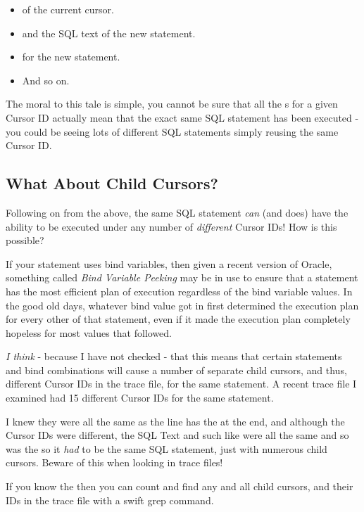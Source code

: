 \begin{itemize}
	\item {} of the current cursor.
	\item {} and the SQL text of the new statement.
	\item {} for the new statement.
	\item And so on.
\end{itemize}

The moral to this tale is simple, you cannot be sure that all the s for a given Cursor ID actually mean that the exact same SQL statement has been executed - you could be seeing lots of different SQL statements simply reusing the same Cursor ID.

\subsection{What About Child Cursors?}

Following on from the above, the same SQL statement \emph{can} (and does) have the ability to be executed under any number of \emph{different} Cursor IDs! How is this possible?

If your statement uses bind variables, then given a recent version of Oracle, something called \emph{Bind Variable Peeking} may be in use to ensure that a statement has the most efficient plan of execution regardless of the bind variable values. In the good old days, whatever bind value got in first determined the execution plan for every other  of that statement, even if it made the execution plan completely hopeless for most values that followed.

\emph{I think} - because I have not checked - that this means that certain statements and bind combinations will cause a number of separate child cursors, and thus, different Cursor IDs in the trace file, for the same statement. A recent trace file I examined had 15 different Cursor IDs for the same statement. 

I knew they were all the same as the  line has the  at the end, and although the Cursor IDs were different, the SQL Text and such like were all the same and so was the  so it \emph{had} to be the same SQL statement, just with numerous child cursors. Beware of this when looking in trace files!

If you know the  then you can count and find any and all child cursors, and their IDs in the trace file with a swift grep command.

